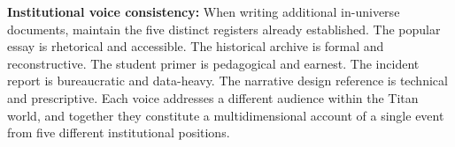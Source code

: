 \documentclass[11pt]{article}
\begin{document}
\textbf{Institutional voice consistency:} When writing additional in-universe documents, maintain the five distinct registers already established. The popular essay is rhetorical and accessible. The historical archive is formal and reconstructive. The student primer is pedagogical and earnest. The incident report is bureaucratic and data-heavy. The narrative design reference is technical and prescriptive. Each voice addresses a different audience within the Titan world, and together they constitute a multidimensional account of a single event from five different institutional positions.
\end{document}
